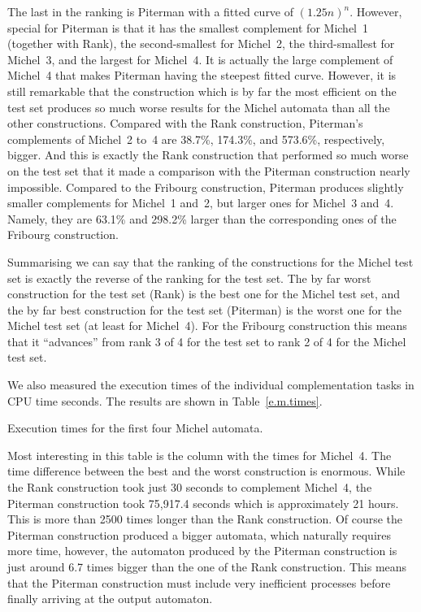 The last in the ranking is Piterman with a fitted curve of $(1.25n)^n$. However, special for Piterman is that it has the smallest complement for Michel~1 (together with Rank), the second-smallest for Michel~2, the third-smallest for Michel~3, and the largest for Michel~4. It is actually the large complement of Michel~4 that makes Piterman having the steepest fitted curve. However, it is still remarkable that the construction which is by far the most efficient on the \goal{} test set produces so much worse results for the Michel automata than all the other constructions. Compared with the Rank construction, Piterman's complements of Michel~2 to~4 are 38.7\%, 174.3\%, and 573.6\%, respectively, bigger. And this is exactly the Rank construction that performed so much worse on the \goal{} test set that it made a comparison with the Piterman construction nearly impossible. Compared to the Fribourg construction, Piterman produces slightly smaller complements for Michel~1 and~2, but larger ones for Michel~3 and~4. Namely, they are 63.1\% and 298.2\% larger than the corresponding ones of the Fribourg construction.

Summarising we can say that the ranking of the constructions for the Michel test set is exactly the reverse of the ranking for the \goal{} test set. The by far worst construction for the \goal{} test set (Rank) is the best one for the Michel test set, and the by far best construction for the \goal{} test set (Piterman) is the worst one for the Michel test set (at least for Michel~4). For the Fribourg construction this means that it ``advances'' from rank 3 of 4 for the \goal{} test set to rank 2 of 4 for the Michel test set.

We also measured the execution times of the individual complementation tasks in CPU time seconds. The results are shown in Table~\ref{e.m.times}.

\begin{table}[ht]
\centering

\caption{Execution times for the first four Michel automata.}
\label{e.m.times}
\end{table}

Most interesting in this table is the column with the times for Michel~4. The time difference between the best and the worst construction is enormous. While the Rank construction took just 30 seconds to complement Michel~4, the Piterman construction took 75,917.4 seconds which is approximately 21 hours. This is more than 2500 times longer than the Rank construction. Of course the Piterman construction produced a bigger automata, which naturally requires more time, however, the automaton produced by the Piterman construction is just around 6.7 times bigger than the one of the Rank construction. This means that the Piterman construction must include very inefficient processes before finally arriving at the output automaton.

